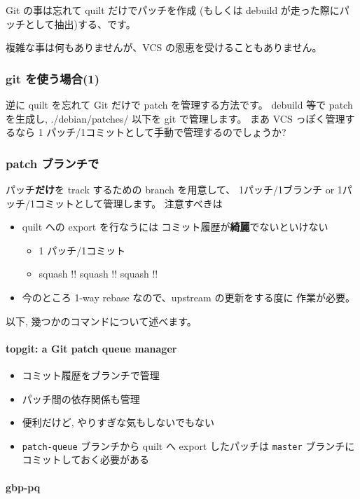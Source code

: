 \documentclass[mingoth,a4paper]{jsarticle}
\begin{document}
Git の事は忘れて quilt だけでパッチを作成
(もしくは debuild が走った際にパッチとして抽出)する、です。

複雑な事は何もありませんが、VCS の恩恵を受けることもありません。

\subsubsection*{git を使う場合(1)}

逆に quilt を忘れて Git だけで patch を管理する方法です。
debuild 等で patch を生成し, {./debian/patches/} 以下を
git で管理します。
%
まあ VCS っぽく管理するなら
1 パッチ/1コミットとして手動で管理するのでしょうか?
%
\subsubsection*{patch ブランチで}

パッチ\textbf{だけ}を track するための branch を用意して、
1パッチ/1ブランチ or 1パッチ/1コミットとして管理します。
注意すべきは
\begin{itemize}
\item quilt への export を行なうには
  コミット履歴が\textbf{綺麗}でないといけない
  \begin{itemize}
  \item 1 パッチ/1コミット
  \item squash !! squash !! squash !!
  \end{itemize}
\item 今のところ 1-way rebase なので、upstream の更新をする度に
  作業が必要。
\end{itemize}

以下, 幾つかのコマンドについて述べます。

\paragraph{topgit: a Git patch queue manager}

\begin{itemize}
\item コミット履歴をブランチで管理
\item パッチ間の依存関係も管理
\item 便利だけど, やりすぎな気もしないでもない
\item \texttt{patch-queue} ブランチから quilt へ export したパッチは
  \texttt{master} ブランチにコミットしておく必要がある
\end{itemize}

\paragraph{gbp-pq}
\end{document}
